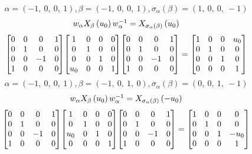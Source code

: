 \documentclass[11pt]{article}
\theoremstyle{definition}
\begin{document}
\providecommand{\scaletoalign}[2]{%
  \sbox0{$#2$}%
  \ifdim\wd0>#1\relax 
    \resizebox{#1}{!}{\usebox0}%
  \else 
    \usebox0%
  \fi 
}
\[
\alpha = \left( -1, \  0, \  0, \  1\right), \beta = \left( -1, \  0, \  0, \  1\right), \sigma_{\alpha}(\beta) = \left( 1, \  0, \  0, \  -1\right)
\]
\[
\scaletoalign{\textwidth}{w_{\alpha} X_{\beta}\left(u_{0}\right) w_{\alpha}^{-1} = X_{\sigma_{\alpha}\left(\beta\right)}\left(u_{0}\right)}
\]
\[
\scaletoalign{\textwidth}{{\left[\begin{matrix}0 & 0 & 0 & 1\\0 & 1 & 0 & 0\\0 & 0 & -1 & 0\\1 & 0 & 0 & 0\end{matrix}\right]} {\left[\begin{matrix}1 & 0 & 0 & 0\\0 & 1 & 0 & 0\\0 & 0 & 1 & 0\\u_{0} & 0 & 0 & 1\end{matrix}\right]} {\left[\begin{matrix}0 & 0 & 0 & 1\\0 & 1 & 0 & 0\\0 & 0 & -1 & 0\\1 & 0 & 0 & 0\end{matrix}\right]} = {\left[\begin{matrix}1 & 0 & 0 & u_{0}\\0 & 1 & 0 & 0\\0 & 0 & 1 & 0\\0 & 0 & 0 & 1\end{matrix}\right]}}
\]
\[
\alpha = \left( -1, \  0, \  0, \  1\right), \beta = \left( -1, \  0, \  1, \  0\right), \sigma_{\alpha}(\beta) = \left( 0, \  0, \  1, \  -1\right)
\]
\[
\scaletoalign{\textwidth}{w_{\alpha} X_{\beta}\left(u_{0}\right) w_{\alpha}^{-1} = X_{\sigma_{\alpha}\left(\beta\right)}\left(- u_{0}\right)}
\]
\[
\scaletoalign{\textwidth}{{\left[\begin{matrix}0 & 0 & 0 & 1\\0 & 1 & 0 & 0\\0 & 0 & -1 & 0\\1 & 0 & 0 & 0\end{matrix}\right]} {\left[\begin{matrix}1 & 0 & 0 & 0\\0 & 1 & 0 & 0\\u_{0} & 0 & 1 & 0\\0 & 0 & 0 & 1\end{matrix}\right]} {\left[\begin{matrix}0 & 0 & 0 & 1\\0 & 1 & 0 & 0\\0 & 0 & -1 & 0\\1 & 0 & 0 & 0\end{matrix}\right]} = {\left[\begin{matrix}1 & 0 & 0 & 0\\0 & 1 & 0 & 0\\0 & 0 & 1 & - u_{0}\\0 & 0 & 0 & 1\end{matrix}\right]}}
\]
\end{document}
